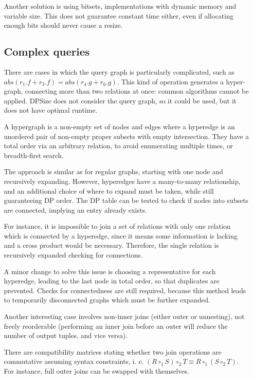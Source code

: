 Another solution is using bitsets, implementations with dynamic memory and variable size. This does not guarantee constant time either, even if allocating enough bits should never cause a resize.

\subsection{Complex queries}
There are cases in which the query graph is particularly complicated, such as $abs(r_1.f + r_3.f) = abs(r_4.g + r_6.g)$. This kind of operation generates a hyper-graph, connecting more than two relations at once: common algorithms cannot be applied. DPSize does not consider the query graph, so it could be used, but it does not have optimal runtime.

A hypergraph is a non-empty set of nodes and edges where a hyperedge is an unordered pair of non-empty proper subsets with empty intersection. They have a total order via an arbitrary relation, to avoid enumerating multiple times, or breadth-first search.

The approach is similar as for regular graphs, starting with one node and recursively expanding. However, hyperedges have a many-to-many relationship, and an additional choice of where to expand must be taken, while still guaranteeing DP order. The DP table can be tested to check if nodes into subsets are connected, implying an entry already exists. 

For instance, it is impossible to join a set of relations with only one relation which is connected by a hyperedge, since it means some information is lacking and a cross product would be necessary. Therefore, the single relation is recursively expanded checking for connections.

A minor change to solve this issue is choosing a representative for each hyperedge, leading to the last node in total order, so that duplicates are prevented. Checks for connectedness are still required, because this method leads to temporarily disconnected graphs which must be further expanded.

Another interesting case involves non-inner joins (either outer or unnesting), not freely reorderable (performing an inner join before an outer will reduce the number of output tuples, and vice versa). 

There are compatibility matrices stating whether two join operations are commutative assuming syntax constraints, i. e. $(R \circ_1 S) \circ_2 T \equiv R \circ_1 (S \circ_2 T)$. For instance, full outer joins can be swapped with themselves. 

